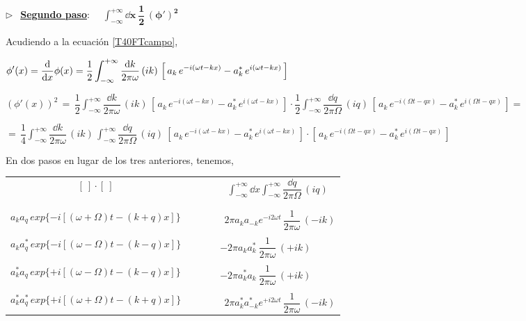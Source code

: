 \vspace{5mm}
$\boldsymbol \triangleright\ \ $ \textbf{\underline{Segundo paso}}: $\quad \displaystyle \boldsymbol{ \int_{-\infty}^{+\infty} \dd x \ \dfrac 1 2 \, (\phi')^2 }$

Acudiendo a la ecuación \ref{T40FTcampo},

$\displaystyle \phi'(x)=\dv{x} \phi(x)=	\dfrac 1 2 \int_{-\infty}^{+\infty} \dfrac{\dd k}{2\pi \omega}\, (ik)\, \left[ \, a_k \, e^{-i(\omega t-kx)} -a^*_k \, e^{i(\omega t-kx)} \,  \right]$

$\displaystyle (\phi'(x))^2 \, = \, \dfrac 1 2 \int_{-\infty}^{+\infty} \dfrac{\dd k}{2\pi \omega}\, (ik)\, \left[ \, a_k \, e^{-i(\omega t-kx)} -a^*_k \, e^{i(\omega t-kx)} \,  \right] \cdot  \dfrac 1 2 \int_{-\infty}^{+\infty} \dfrac{\dd q}{2\pi \Omega}\, (iq)\, \left[ \, a_k \, e^{-i(\Omega t-qx)} -a^*_k \, e^{i(\Omega t-qx)} \,  \right] =$

$\displaystyle = \, \dfrac 1 4 \int_{-\infty}^{+\infty} \dfrac{\dd k}{2\pi \omega}\, (ik)\, \int_{-\infty}^{+\infty} \dfrac{\dd q}{2\pi \Omega}\, (iq)\
\left[ \, a_k \, e^{-i(\omega t-kx)} -a^*_k \, e^{i(\omega t-kx)} \,  \right] \cdot \left[ \, a_k \, e^{-i(\Omega t-qx)} -a^*_k \, e^{i(\Omega t-qx)} \,  \right] $

\vspace{5mm} En dos pasos en lugar de los tres anteriores, tenemos,

\vspace{5mm}
\begin{table}[H]
\center
\begin{tabular}{lll}
\multicolumn{1}{c}{$[\ ] \cdot [\ ] $} & \multicolumn{1}{c}{$\qquad$} & \multicolumn{1}{c}{$\displaystyle \int_{-\infty}^{+\infty} \dd x \int_{-\infty}^{+\infty} \dfrac{\dd q}{2\pi \Omega} \, (iq)$} \\ 
 &  &  \\ \hline \\
 $a_k a_q \, exp \{ -i [(\omega+\Omega)t-(k+q)x] \} $&  &  $\ \ 2\pi a_ka_{-k} e^{-i2\omega t} \, \dfrac {1}{2\pi \omega} \, (-ik)$ \\ \\ 
 $a_k a^*_q \, exp \{ -i [(\omega-\Omega)t-(k-q)x] \} $&  &  $-2\pi a_ka^*_{k}\   \dfrac {1}{2\pi \omega} \, (+ik)$ \\ \\ 
 $a^*_k a_q \, exp \{ +i [(\omega-\Omega)t-(k-q)x] \} $&  &  $-2\pi a^*_ka_{k}\  \dfrac {1}{2\pi \omega} \, (+ik)$ \\ \\
 $a^*_k a^*_q \, exp \{ +i [(\omega+\Omega)t-(k+q)x] \} $&  &  $\ \ 2\pi a^*_ka^*_{-k} e^{+i2\omega t} \, \dfrac {1}{2\pi \omega} \, (-ik)$ 
\end{tabular}
\end{table}

